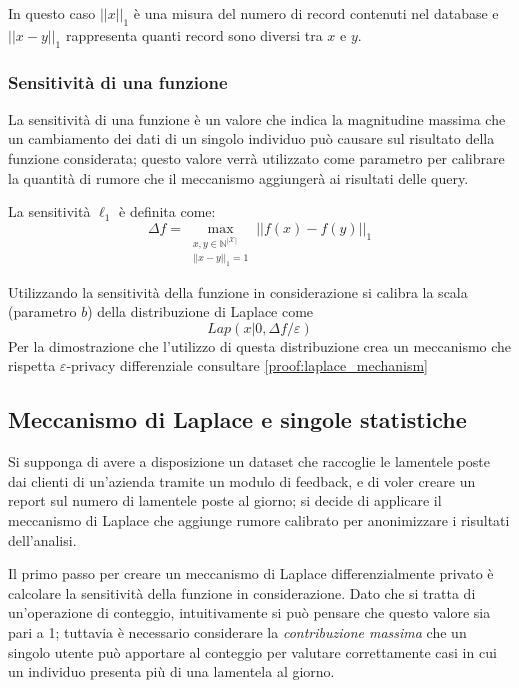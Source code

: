 In questo caso $||x||_1$ è una misura del numero di record contenuti nel database e $||x - y||_1$ rappresenta quanti record sono diversi tra $x$ e $y$.

\subsubsection{Sensitività di una funzione}
La sensitività di una funzione è un valore che indica la magnitudine massima che un cambiamento dei dati di un singolo individuo può causare sul risultato della funzione considerata; questo valore verrà utilizzato come parametro per calibrare la quantità di rumore che il meccanismo aggiungerà ai risultati delle query.

La sensitività $\ell_1$ è definita come:
\begin{equation}
    \label{eq:sensitivity}
    \Delta f = \max_{\substack{x,y \in \mathbb{N}^{|\mathcal{X}|}\\||x - y||_1 = 1}} ||f(x) - f(y)||_1
\end{equation}

Utilizzando la sensitività della funzione in considerazione si calibra la scala (parametro $b$) della distribuzione di Laplace come 
\begin{equation}
    \label{expr:laplace-sensitivity}
    Lap(x|0,\Delta f/\varepsilon)
\end{equation}
Per la dimostrazione che l'utilizzo di questa distribuzione crea un meccanismo che 
rispetta $\varepsilon$-privacy differenziale consultare \ref{proof:laplace_mechanism}

\subsection{Meccanismo di Laplace e singole statistiche}
Si supponga di avere a disposizione un dataset che raccoglie le lamentele poste dai clienti di un'azienda tramite un modulo di feedback, e di voler creare un report sul numero di lamentele poste al giorno; si decide di applicare il meccanismo di Laplace che aggiunge rumore calibrato per anonimizzare i risultati dell'analisi.

Il primo passo per creare un meccanismo di Laplace differenzialmente privato è calcolare la sensitività della funzione in considerazione. Dato che si tratta di un'operazione di conteggio, intuitivamente si può pensare che questo valore sia pari a 1; tuttavia è necessario considerare la \textit{contribuzione massima} che un singolo utente può apportare al conteggio per valutare correttamente casi in cui un individuo presenta più di una lamentela al giorno.

